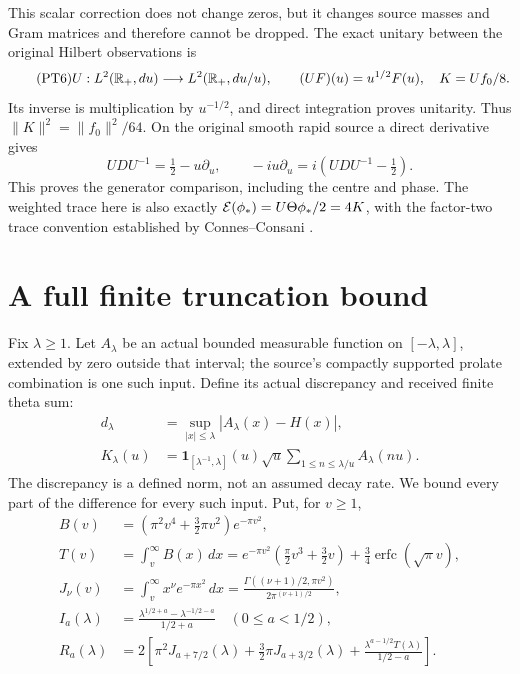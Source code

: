 This scalar correction does not change zeros, but it changes
source masses and Gram matrices and therefore cannot be dropped.
The exact unitary between the original Hilbert observations is
\begin{equation}\tag{PT6}
 U:L^2(\mathbb R_+,du)\longrightarrow L^2(\mathbb R_+,du/u),\qquad
 (UF)(u)=u^{1/2}F(u),\quad K=Uf_0/8.
\end{equation}
Its inverse is multiplication by $u^{-1/2}$, and direct integration
proves unitarity. Thus $\|K\|^2=\|f_0\|^2/64$.
On the original smooth rapid source a direct derivative gives
\begin{equation}\tag{PT7}
 UDU^{-1}=\tfrac12-u\partial_u,
 \qquad -iu\partial_u=i(UDU^{-1}-\tfrac12).
\end{equation}
This proves the generator comparison, including the centre and phase.
The weighted trace here is also exactly
$\mathcal E(\phi_*)=U\Theta\phi_*/2=4K$, with the factor-two trace
convention established by Connes--Consani \cite{swtheta:Hochschild}.

\section{A full finite truncation bound}
Fix $\lambda\geq1$. Let $A_\lambda$ be an actual bounded measurable function
on $[-\lambda,\lambda]$, extended by zero outside that interval;
the source's compactly supported prolate combination is one such
input. Define its actual discrepancy and received finite theta sum:
\begin{equation}\tag{PT8}
 \begin{split}
 d_\lambda&=\sup_{|x|\leq\lambda}|A_\lambda(x)-H(x)|,\\
 K_\lambda(u)&=\mathbf1_{[\lambda^{-1},\lambda]}(u)\sqrt u
                 \sum_{1\leq n\leq\lambda/u}A_\lambda(nu).
 \end{split}
\end{equation}
The discrepancy is a defined norm, not an assumed decay rate.
We bound every part of the difference for every such input.
Put, for $v\geq1$,
\begin{equation}\tag{PT9}
 \begin{split}
 B(v)&=(\pi^2v^4+\tfrac32\pi v^2)e^{-\pi v^2},\\
 T(v)&=\int_v^\infty B(x)\,dx
   =e^{-\pi v^2}(\tfrac\pi2v^3+\tfrac32v)
                      +\tfrac34\operatorname{erfc}(\sqrt\pi v),\\
 J_\nu(v)&=\int_v^\infty x^\nu e^{-\pi x^2}\,dx
     =\frac{\Gamma((\nu+1)/2,\pi v^2)}{2\pi^{(\nu+1)/2}},\\
 I_a(\lambda)&=\frac{\lambda^{1/2+a}-\lambda^{-1/2-a}}{1/2+a}
                                     \quad(0\leq a<1/2),\\
 R_a(\lambda)&=2\left[\pi^2J_{a+7/2}(\lambda)
       +\tfrac32\pi J_{a+3/2}(\lambda)
       +\frac{\lambda^{a-1/2}T(\lambda)}{1/2-a}\right].
 \end{split}
\end{equation}

